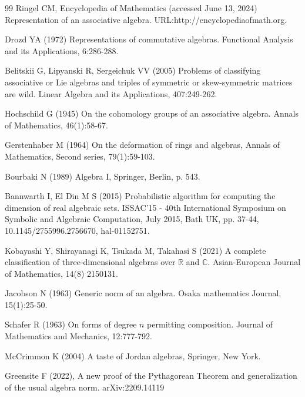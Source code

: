 \documentclass{amsart}
\numberwithin{equation}{section}
\theoremstyle{definition}
\numberwithin{theorem}{section}
\begin{document}
\vspace{1cm}
  

   \begin{thebibliography}{99}
 Ringel CM, Encyclopedia of Mathematics (accessed June 13, 2024) Representation of an associative algebra. URL:http://encyclopediaofmath.org.
   
     Drozd YA (1972) Representations of commutative algebras. Functional Analysis and its Applications, 6:286-288.
          
        Belitskii G, Lipyanski R, Sergeichuk VV (2005) Problems of classifying associative or Lie algebras and triples of symmetric or skew-symmetric matrices are wild.  Linear Algebra and its Applications, 407:249-262.
       
        Hochschild G (1945) On the cohomology groups of an associative algebra.  Annals of Mathematics, 46(1):58-67.
       
             Gerstenhaber M (1964) On the deformation of rings and algebras, Annals of Mathematics, Second series, 79(1):59-103.
       
               Bourbaki N (1989) Algebra I, Springer, Berlin, p. 543.

               
        Bannwarth I, El Din M S (2015) Probabilistic algorithm for computing the dimension of real algebraic sets.  ISSAC'15 - 40th International Symposium on Symbolic and Algebraic Computation, July 2015, Bath UK, pp. 37-44, 10.1145/2755996.2756670, hal-01152751.
       
               Kobayashi Y, Shirayanagi K, Tsukada M, Takahasi S (2021) A complete classification of three-dimensional algebras over $\mathbb{R}$ and $\mathbb{C}$. Asian-European Journal of Mathematics, 14(8) 2150131.                                        
   
               Jacobson N  (1963) Generic norm of an algebra. Osaka mathematics Journal, 15(1):25-50.
  
          Schafer R (1963) On forms of degree $n$ permitting composition. Journal of Mathematics and Mechanics, 12:777-792. 
         
      
        McCrimmon K (2004) A taste of Jordan algebras, Springer, New York.
       

               Greensite F (2022), A new proof of the Pythagorean Theorem and generalization of the usual algebra norm. arXiv:2209.14119
              

\end{thebibliography}
\end{document}
